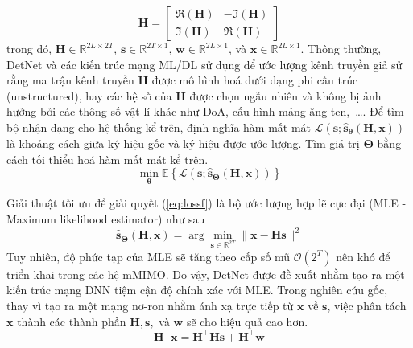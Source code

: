 \begin{equation}
\label{eq:matrixtras2}
    \mathbf{H}=\left[\begin{array}{cc}
    \Re(\mathbf{H}) & -\Im(\mathbf{H}) \\
    \Im(\mathbf{H}) & \Re(\mathbf{H})
    \end{array}\right]
\end{equation}
trong đó, $\mathbf{H} \in \mathbb{R}^{2L \times 2T}$, $\mathbf{s} \in \mathbb{R}^{2T \times 1}$, $\mathbf{w} \in \mathbb{R}^{2L \times 1}$, và $\mathbf{x} \in \mathbb{R}^{2L \times 1}$. Thông thường, DetNet và các kiến trúc mạng ML/DL sử dụng để ước lượng kênh truyền giả sử rằng ma trận kênh truyền $\mathbf{H}$ được mô hình hoá dưới dạng phi cấu trúc (unstructured), hay các hệ số của $\mathbf{H}$ được chọn ngẫu nhiên và không bị ảnh hưởng bởi các thông số vật lí khác như DoA, cấu hình mảng ăng-ten,~\ldots . Để tìm bộ nhận dạng cho hệ thống kể trên, định nghĩa hàm mất mát $\mathcal{L}\left(\mathbf{s} ; \hat{\mathbf{s}}_{\boldsymbol{\theta}}(\mathbf{H}, \mathbf{x})\right)$ là khoảng cách giữa ký hiệu gốc và ký hiệu được ước lượng. Tìm giá trị $\boldsymbol{\Theta}$ bằng cách tối thiểu hoá hàm mất mát kể trên.
\begin{equation}
\label{eq:lossf}
\min _{\boldsymbol{\theta}} \mathbb{E}\left\{\mathcal{L}\left(\mathbf{s} ; \hat{\mathbf{s}}_{\boldsymbol{\Theta}}(\mathbf{H}, \mathbf{x})\right)\right\}
\end{equation}

Giải thuật tối ưu để giải quyết (\ref{eq:lossf}) là bộ ước lượng hợp lẽ cực đại (MLE - Maximum likelihood estimator) như sau
\begin{equation}
\label{eq:mle}
\hat{\mathbf{s}}_{\boldsymbol{\Theta}}(\mathbf{H}, \mathbf{x})=\arg \min _{\mathbf{s} \in \mathbb{R}^{2T}}\|\mathbf{x}-\mathbf{H} \mathbf{s}\|^2
\end{equation}
Tuy nhiên, độ phức tạp của MLE sẽ tăng theo cấp số mũ $\mathcal{O}(2^T)$ nên khó để triển khai trong các hệ mMIMO. Do vậy, DetNet được đề xuất nhằm tạo ra một kiến trúc mạng DNN tiệm cận độ chính xác với MLE. Trong nghiên cứu gốc, thay vì tạo ra một mạng nơ-ron nhằm ánh xạ trực tiếp từ $\mathbf{x}$ về $\mathbf{s}$, việc phân tách $\mathbf{x}$ thành các thành phần $\mathbf{H}, \mathbf{s},$ và $\mathbf{w}$ sẽ cho hiệu quả cao hơn.
\begin{equation}
    \mathbf{H}^\top \mathbf{x}=\mathbf{H}^\top \mathbf{H s}+\mathbf{H}^\top \mathbf{w}
\end{equation}

